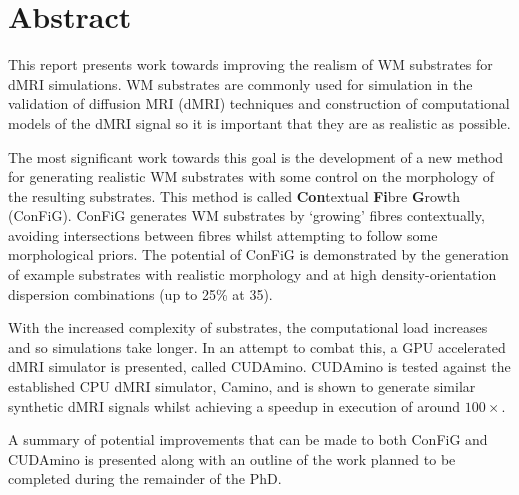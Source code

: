 \chapter*{Abstract}

This report presents work towards improving the realism of \ac{WM} substrates for \ac{dMRI} simulations.
\ac{WM} substrates are commonly used for simulation in the validation of diffusion MRI (dMRI) techniques and construction of computational models of the \ac{dMRI} signal so it is important that they are as realistic as possible.

The most significant work towards this goal is the development of a new method for generating realistic \ac{WM} substrates with some control on the morphology of the resulting substrates.
This method is called \textbf{Con}textual \textbf{Fi}bre \textbf{G}rowth (\acs{ConFiG}).
\ac{ConFiG} generates \ac{WM} substrates by `growing' fibres contextually, avoiding intersections between fibres whilst attempting to follow some morphological priors.
The potential of \ac{ConFiG} is demonstrated by the generation of example substrates with realistic morphology and at high density-orientation dispersion combinations (up to 25\% at 35\degree).

With the increased complexity of substrates, the computational load increases and so simulations take longer.
In an attempt to combat this, a \ac{GPU} accelerated \ac{dMRI} simulator is presented, called CUDAmino.
CUDAmino is tested against the established \ac{CPU} \ac{dMRI} simulator, Camino, and is shown to generate similar synthetic \ac{dMRI} signals whilst achieving a speedup in execution of around $100\times$. 

A summary of potential improvements that can be made to both \ac{ConFiG} and CUDAmino is presented along with an outline of the work planned to be completed during the remainder of the PhD. 
\acresetall
